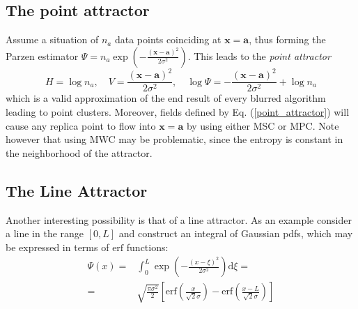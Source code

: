 \documentclass[preprint,12pt]{elsarticle}
\begin{document}
\subsection{The point attractor}
\label{point}
Assume a situation of $n_a$ data points coinciding at $\mathbf{x}=\mathbf{a}$, thus forming the Parzen estimator $\Psi=n_a \exp \left( -\frac{\left( \mathbf{x}-\mathbf{a} \right)^2}{2\sigma^2} \right)$. This leads to the \textit{point attractor} 
\begin{equation}\label{point_attractor}
  H=\log n_a,\quad V=\frac{\left(\mathbf{x}-\mathbf{a}\right)^2}{2\sigma^2},\quad \log\Psi=-\frac{\left(\mathbf{x}-\mathbf{a}\right)^2}{2\sigma^2}+\log n_a
\end{equation}
which is a valid approximation of the end result of every blurred algorithm leading to point clusters. Moreover, fields defined by Eq. (\ref{point_attractor}) will cause any replica point to flow into $\mathbf{x}=\mathbf{a}$ by using either MSC  or MPC. Note however that using MWC may be problematic, since the entropy is constant in the neighborhood of the attractor.

























\subsection{The Line Attractor}
\label{line}
Another interesting possibility is that of a line attractor. As an example consider a line in the range $[0,L]$ and construct an integral of Gaussian pdfs, which may be expressed in terms of $\textrm{erf}$ functions:
\begin{equation}\label{line_attractor_psi}
\begin{aligned}
  \Psi(x)=&\int_{0}^{L}\exp\left( -\frac{\left( x-\xi \right)^2}{2\sigma^2} \right) \mathrm{d} \xi=\\
  =&\sqrt{\frac{\pi \sigma^2}{2}}\left[\mathrm{erf}\left(\frac{x}{\sqrt{2}\sigma}\right)-\mathrm{erf}\left(\frac{x-L}{\sqrt{2}\sigma}\right)\right]
 \end{aligned}
\end{equation}
\end{document}
